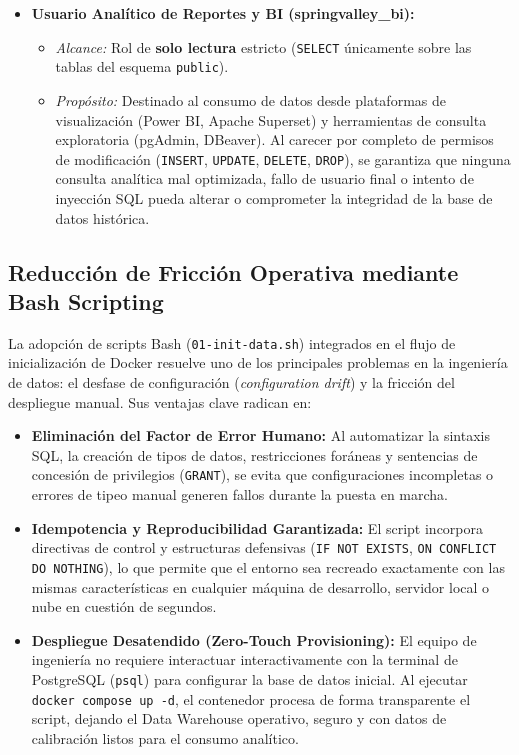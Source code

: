 \begin{itemize}
	\item \textbf{Usuario Analítico de Reportes y BI (springvalley\_bi):}
	\begin{itemize}
		\item \textit{Alcance:} Rol de \textbf{solo lectura} estricto (\texttt{SELECT} únicamente sobre las tablas del esquema \texttt{public}).
		\item \textit{Propósito:} Destinado al consumo de datos desde plataformas de visualización (Power BI, Apache Superset) y herramientas de consulta exploratoria (pgAdmin, DBeaver). Al carecer por completo de permisos de modificación (\texttt{INSERT}, \texttt{UPDATE}, \texttt{DELETE}, \texttt{DROP}), se garantiza que ninguna consulta analítica mal optimizada, fallo de usuario final o intento de inyección SQL pueda alterar o comprometer la integridad de la base de datos histórica.
	\end{itemize}
\end{itemize}

\subsection{Reducción de Fricción Operativa mediante Bash Scripting}
La adopción de scripts Bash (\texttt{01-init-data.sh}) integrados en el flujo de inicialización de Docker resuelve uno de los principales problemas en la ingeniería de datos: el desfase de configuración (\textit{configuration drift}) y la fricción del despliegue manual. Sus ventajas clave radican en:

\begin{itemize}
	\item \textbf{Eliminación del Factor de Error Humano:} Al automatizar la sintaxis SQL, la creación de tipos de datos, restricciones foráneas y sentencias de concesión de privilegios (\texttt{GRANT}), se evita que configuraciones incompletas o errores de tipeo manual generen fallos durante la puesta en marcha.
	\item \textbf{Idempotencia y Reproducibilidad Garantizada:} El script incorpora directivas de control y estructuras defensivas (\texttt{IF NOT EXISTS}, \texttt{ON CONFLICT DO NOTHING}), lo que permite que el entorno sea recreado exactamente con las mismas características en cualquier máquina de desarrollo, servidor local o nube en cuestión de segundos.
	\item \textbf{Despliegue Desatendido (Zero-Touch Provisioning):} El equipo de ingeniería no requiere interactuar interactivamente con la terminal de PostgreSQL (\texttt{psql}) para configurar la base de datos inicial. Al ejecutar \texttt{docker compose up -d}, el contenedor procesa de forma transparente el script, dejando el Data Warehouse operativo, seguro y con datos de calibración listos para el consumo analítico.
\end{itemize}

